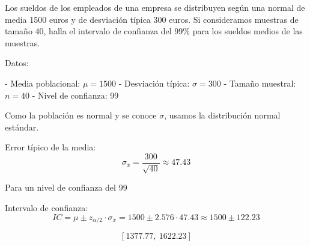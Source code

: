 \documentclass[addpoints,spanish, 12pt,a4paper]{exam}
\renewcommand*\half{.5}
\begin{document}
\begin{questions}













\question[1\half] Los sueldos de los empleados de una empresa se distribuyen según una normal de media 1500 euros y de desviación típica 300 euros. Si consideramos muestras de tamaño 40, halla el intervalo de confianza del 99\% para los sueldos medios de las muestras.

\begin{solution}
Datos:

- Media poblacional: \( \mu = 1500 \)
- Desviación típica: \( \sigma = 300 \)
- Tamaño muestral: \( n = 40 \)
- Nivel de confianza: 99%

Como la población es normal y se conoce \( \sigma \), usamos la distribución normal estándar.

Error típico de la media:
\[
\sigma_{\bar{x}} = \frac{300}{\sqrt{40}} \approx 47.43
\]

Para un nivel de confianza del 99%

Intervalo de confianza:
\[
IC = \mu \pm z_{\alpha/2} \cdot \sigma_{\bar{x}} = 1500 \pm 2.576 \cdot 47.43 \approx 1500 \pm 122.23
\]

\[
\boxed{[1377.77,\ 1622.23]}
\]
\end{solution}


\end{questions}
\end{document}
